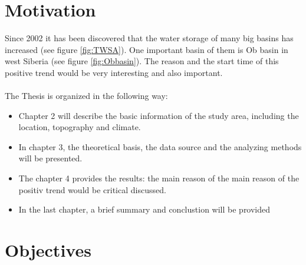\section{Motivation}
Since 2002 it has been discovered that the water storage of many big basins has increased (see figure \ref{fig:TWSA}). One important basin of them is Ob basin in west Siberia (see figure \ref{fig:Obbasin}). The reason and the start time of this positive trend would be very interesting and also important. \\\\
The Thesis is organized in the following way:
\begin{itemize}
	\item Chapter 2 will describe the basic information of the study area, including the location, topography and climate.
	\item In chapter 3, the theoretical basis, the data source and the analyzing methods will be presented.
	\item The chapter 4 provides the results: the main reason of the main reason of the positiv trend would be critical discussed.
	\item In the last chapter, a brief summary and conclustion will be provided
\end{itemize}
\section{Objectives}